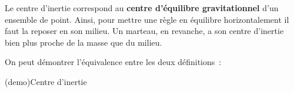 \documentclass[../../main/main.tex]{subfiles}
\begin{document}
Le centre d'inertie correspond au \textbf{centre d'équilibre gravitationnel}
d'un ensemble de point. Ainsi, pour mettre une règle en équilibre
horizontalement il faut la reposer en son milieu. Un marteau, en revanche, a son
centre d'inertie bien plus proche de la masse que du milieu.

On peut démontrer l'équivalence entre les deux définitions~:
\begin{tcb*}(demo){Centre d'inertie}
\end{tcb*}
\end{document}
